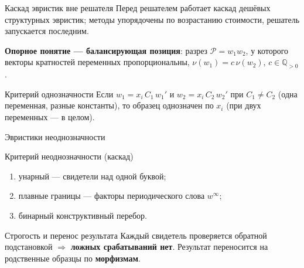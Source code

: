 \documentclass[aspectratio=169,11pt]{beamer}
\newcommand{\PP}{\mathcal{P}}
\begin{document}
\begin{frame}{Каскад эвристик вне решателя}
  Перед решателем работает каскад дешёвых структурных эвристик; методы упорядочены
  по возрастанию стоимости, решатель запускается последним.

  \medskip
  \textbf{Опорное понятие --- балансирующая позиция}: разрез $\PP=w_1w_2$,
  у которого векторы кратностей переменных пропорциональны,
  $\nu(w_1)=c\,\nu(w_2)$, $c\in\mathbb{Q}_{>0}$.

  \bigskip
  \begin{block}{Критерий однозначности}
    Если $w_1=x_i\,C_1\,w_1'$ и $w_2=x_i\,C_2\,w_2'$ при $C_1\neq C_2$
    (одна переменная, разные константы), то образец однозначен по $x_i$
    (при двух переменных --- в целом).
  \end{block}
\end{frame}

\begin{frame}{Эвристики неоднозначности}
  \begin{block}{Критерий неоднозначности (каскад)}
    \begin{enumerate}\setlength{\itemsep}{4pt}
      \item унарный --- свидетели над одной буквой;
      \item плавные границы --- факторы периодического слова $w^\infty$;
      \item бинарный конструктивный перебор.
    \end{enumerate}
  \end{block}

  \medskip
  \begin{alertblock}{Строгость и перенос результата}
    Каждый свидетель проверяется обратной подстановкой $\Rightarrow$
    \textbf{ложных срабатываний нет}. Результат переносится на родственные
    образцы по \textbf{морфизмам}.
  \end{alertblock}
\end{frame}
\end{document}
